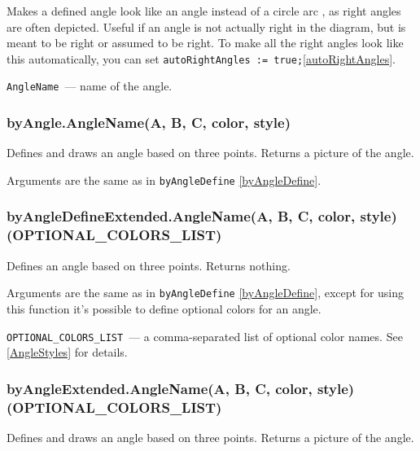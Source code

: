 	Makes a defined angle look like an angle  instead of a circle arc , as right angles are often depicted. Useful if an angle is not actually right in the diagram, but is meant to be right or assumed to be right. To make all the right angles look like this automatically, you can set \texttt{autoRightAngles := true;}\ref{autoRightAngles}.
	
	\texttt{AngleName}~— name of the angle. 


\subsubsection{byAngle.AngleName(A, B, C, color, style)}\label{byAngle}

	Defines and draws an angle based on three points. Returns a picture of the angle.
	
	Arguments are the same as in \texttt{byAngleDefine} \ref{byAngleDefine}.

\subsubsection{byAngleDefineExtended.AngleName(A, B, C, color, style)(OPTIONAL\_COLORS\_LIST)}\label{byAngleDefineExtended}

	Defines an angle based on three points. Returns nothing.
	
	Arguments are the same as in \texttt{byAngleDefine} \ref{byAngleDefine}, except for using this function it's possible to define optional colors for an angle.
	
	\texttt{OPTIONAL\_COLORS\_LIST}~— a comma-separated list of optional color names. See \ref{AngleStyles} for details.
	
\subsubsection{byAngleExtended.AngleName(A, B, C, color, style)(OPTIONAL\_COLORS\_LIST)}\label{byAngleExtended}

	Defines and draws an angle based on three points. Returns a picture of the angle.
	
